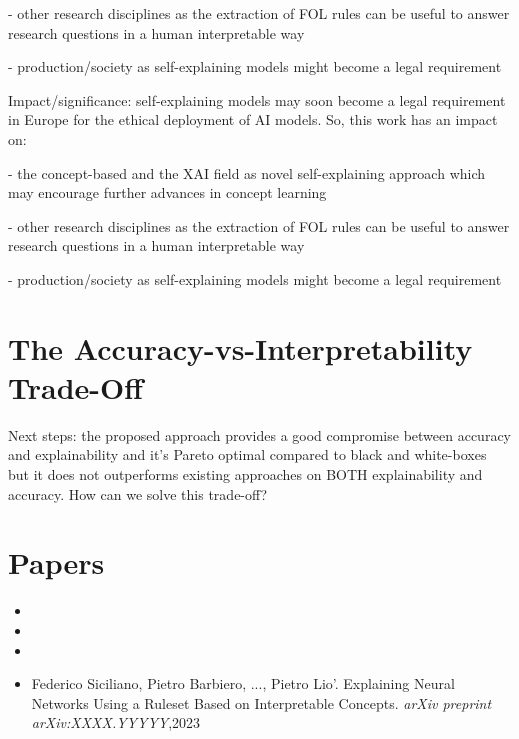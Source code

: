 - other research disciplines as the extraction of FOL rules can be useful to answer research questions in a human interpretable way

- production/society as self-explaining models might become a legal requirement


Impact/significance: self-explaining models may soon become a legal requirement in Europe for the ethical deployment of AI models. So, this work has an impact on:

- the concept-based and the XAI field as novel self-explaining approach which may encourage further advances in concept learning

- other research disciplines as the extraction of FOL rules can be useful to answer research questions in a human interpretable way

- production/society as self-explaining models might become a legal requirement


\section{The Accuracy-vs-Interpretability Trade-Off}
Next steps: the proposed approach provides a good compromise between accuracy and explainability and it's Pareto optimal compared to black and white-boxes but it does not outperforms existing approaches on BOTH explainability and accuracy. How can we solve this trade-off?



\section*{Papers}
\nobibliography*
\begin{itemize}
    \item {}
    \item {}
    \item {}
    \item Federico Siciliano, Pietro Barbiero, ..., Pietro Lio'. Explaining Neural Networks Using a Ruleset Based on Interpretable Concepts. \textit{arXiv preprint arXiv:XXXX.YYYYY},2023
\end{itemize}
